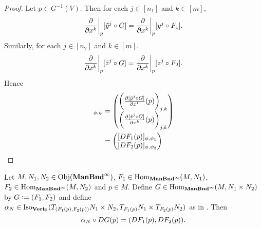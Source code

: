 \documentclass{book}
\begin{document}
	\begin{proof}
		Let $p \in G^{-1}(V)$. Then for each $j \in [n_1]$ and $k \in [m]$, 
		\begin{align*}
			\frac{\partial}{\partial x^k} \bigg|_p [\tilde{y}^j \circ G] 
			= \frac{\partial}{\partial x^k} \bigg|_p [y^j \circ F_1].
		\end{align*}
		Similarly, for each $j \in [n_2]$ and $k \in [m]$.  
		$$\frac{\partial}{\partial x^k} \bigg|_p [\tilde{z}^j \circ G]  = \frac{\partial}{\partial x^k} \bigg|_p [z^j \circ F_2].$$
		Hence 
		\begin{align*}
			[DG(p)]_{\phi, \psi}
			& = 
			\begin{pmatrix}
				\bigg( \frac{\p [\tl{y}^j \circ G]}{\p x^k}(p) \bigg)_{j,k} \\
				\bigg( \frac{\p [\tl{z}^j \circ G]}{\p x^k}(p) \bigg)_{j,k}
			\end{pmatrix} \\
			& = \begin{pmatrix}
				[DF_1(p)]_{\phi, \psi_1} \\
				[DF_2(p)]_{\phi, \psi_2}
			\end{pmatrix} 
		\end{align*}
	\end{proof}

	\begin{ex} 
		Let $M,N_1, N_2 \in \operatorname{Obj}(\operatorname*{\text{\textbf{ManBnd}}^{\infty}})$, $F_1 \in \operatorname{Hom}_{\operatorname*{\text{\textbf{ManBnd}}^{\infty}}}(M, N_1)$, $F_2 \in \operatorname{Hom}_{\operatorname*{\text{\textbf{ManBnd}}^{\infty}}}(M, N_2)$ and $p \in M$. Define $G \in \operatorname{Hom}_{\operatorname*{\text{\textbf{ManBnd}}^{\infty}}}(M, N_1 \times N_2)$ by $G \vcentcolon= (F_1, F_2)$ and define $\alpha_N \in \operatorname{Iso}_{\operatorname*{\text{\textbf{Vect}}_{\mathbb{R}}}}(T_{(F_1(p), F_2(p))} N_1 \times N_2, T_{F_1(p)} N_1 \times  T_{F_2(p)} N_2)$ as in . Then 
		$$\alpha_N \circ DG(p) = (DF_1(p), DF_2(p)).$$ 
	\end{ex}
\end{document}
